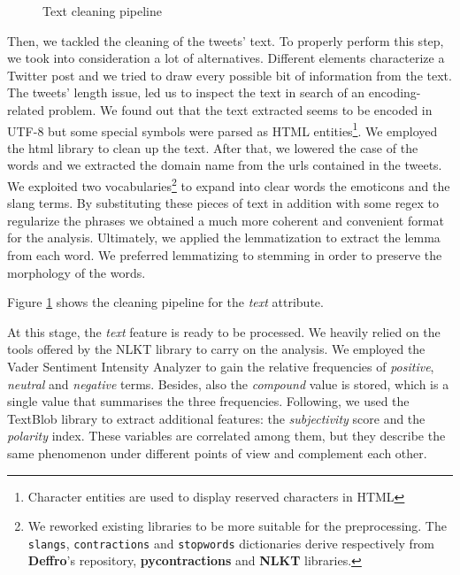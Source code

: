 \documentclass[conference]{IEEEtran}
\begin{document}
\begin{figure}[h]
        \centering
        
        \caption{Text cleaning pipeline}
        \label{fig:cleaning_schema}
\end{figure}
Then, we tackled the cleaning of the tweets' text. To properly perform this step, we took into consideration a lot of alternatives. Different elements characterize a Twitter post and we tried to draw every possible bit of information from the text. The tweets' length issue, led us to inspect the text in search of an encoding-related problem. We found out that the text extracted seems to be encoded in UTF-8\cite{utf8} but some special symbols were parsed as HTML entities\footnote{Character entities are used to display reserved characters in HTML}. We employed the html library to clean up the text. After that, we lowered the case of the words and we extracted the domain name from the urls contained in the tweets. We exploited two vocabularies\footnote{{We reworked existing libraries to be more suitable for the preprocessing. The \texttt{slangs}, \texttt{contractions} and \texttt{stopwords} dictionaries derive respectively from \textbf{Deffro}'s repository\cite{deffro}, \textbf{pycontractions} and \textbf{NLKT} libraries.}} to expand into clear words the emoticons and the slang terms. By substituting these pieces of text in addition with some regex to regularize the phrases we obtained a much more coherent and convenient format for the analysis. Ultimately, we applied the lemmatization\cite{lemmatization} to extract the lemma from each word. We preferred lemmatizing to stemming\cite{stemming} in order to preserve the morphology of the words\cite{stemmingVSlemmatizing}.

Figure \ref{fig:cleaning_schema} shows the cleaning pipeline for the \textit{text} attribute.

At this stage, the \textit{text} feature is ready to be processed. We heavily relied on the tools offered by the NLKT library\cite{nlkt} to carry on the analysis. We employed the Vader Sentiment Intensity Analyzer\cite{vader} to gain the relative frequencies of \textit{positive}, \textit{neutral} and \textit{negative} terms. Besides, also the \textit{compound} value is stored, which is a single value that summarises the three frequencies. Following, we used the TextBlob library\cite{textblob} to extract additional features: the \textit{subjectivity} score and the \textit{polarity} index. These variables are correlated among them, but they describe the same phenomenon under different points of view and complement each other.
\end{document}
